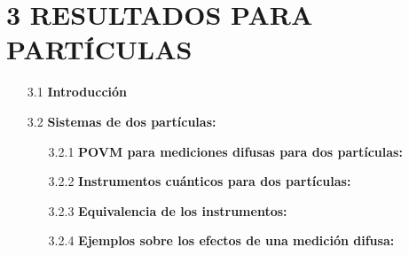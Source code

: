\documentclass[12pt,oneside]{book}\raggedbottom{} %
\begin{document}
\begin{sloppypar}
{{\section*{3 RESULTADOS PARA \texorpdfstring{}{N}  PARTÍCULAS}
\begin{itemize}

  \item[3.1] \textbf{Introducción}   
  
  \item[3.2]  \textbf{Sistemas de dos partículas:}

  \begin{itemize}
    \item[3.2.1] \textbf{POVM para mediciones difusas para dos partículas:}\label{Sec_POVM_para_mediciones_difusas} 
    
    \item[3.2.2] \textbf{Instrumentos cuánticos para dos partículas:}
\item[3.2.3]\textbf{{Equivalencia de los instrumentos}:}
\item[3.2.4] \textbf{Ejemplos sobre los efectos de una medición difusa:}
  \end{itemize}


\end{itemize}}}
\end{sloppypar}
\end{document}
